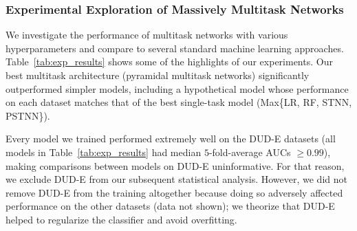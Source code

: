 \subsubsection{Experimental Exploration of Massively Multitask Networks}
\label{sec:experimental}
We investigate the performance of multitask networks with various
hyperparameters and compare to several standard machine learning
approaches. Table~\ref{tab:exp_results} shows some of the highlights of our
experiments. Our best multitask architecture (pyramidal multitask networks)
significantly outperformed simpler models, including a hypothetical model
whose performance on each dataset matches that of the best single-task
model (Max\{LR, RF, STNN, PSTNN\}).

Every model we trained performed extremely well on the DUD-E datasets (all
models in Table~\ref{tab:exp_results} had median $5$-fold-average AUCs
$\ge0.99$), making comparisons between models on DUD-E uninformative. For
that reason, we exclude DUD-E from our subsequent statistical analysis.
However, we did not remove DUD-E from the training altogether because doing
so adversely affected performance on the other datasets (data not shown);
we theorize that DUD-E helped to regularize the classifier and avoid
overfitting.


